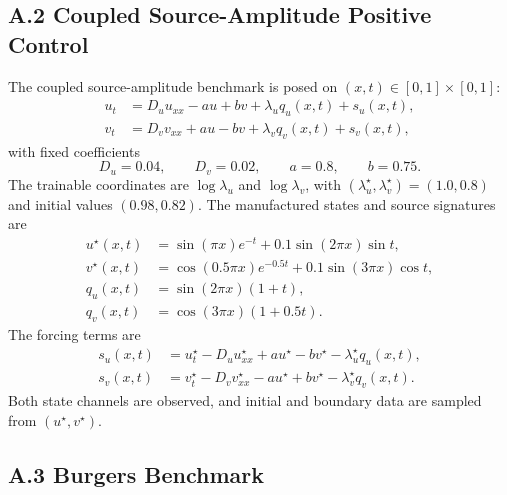 \documentclass[preprint,12pt]{elsarticle}
\begin{document}
\subsection*{A.2 Coupled Source-Amplitude Positive Control}

The coupled source-amplitude benchmark is posed on $(x,t)\in[0,1]\times[0,1]$:
\begin{align}
    u_t &=D_u u_{xx}-a u+bv+\lambda_u q_u(x,t)+s_u(x,t),\\
    v_t &=D_v v_{xx}+a u-bv+\lambda_v q_v(x,t)+s_v(x,t),
\end{align}
with fixed coefficients
\begin{equation}
    D_u=0.04,\qquad D_v=0.02,\qquad a=0.8,\qquad b=0.75.
\end{equation}
The trainable coordinates are $\log\lambda_u$ and $\log\lambda_v$, with $(\lambda_u^\star,\lambda_v^\star)=(1.0,0.8)$ and initial values $(0.98,0.82)$.  The manufactured states and source signatures are
\begin{align}
    u^\star(x,t)&=\sin(\pi x)e^{-t}+0.1\sin(2\pi x)\sin t,\\
    v^\star(x,t)&=\cos(0.5\pi x)e^{-0.5t}+0.1\sin(3\pi x)\cos t,\\
    q_u(x,t)&=\sin(2\pi x)(1+t),\\
    q_v(x,t)&=\cos(3\pi x)(1+0.5t).
\end{align}
The forcing terms are
\begin{align}
    s_u(x,t)&=u_t^\star-D_u u_{xx}^\star+a u^\star-bv^\star-\lambda_u^\star q_u(x,t),\\
    s_v(x,t)&=v_t^\star-D_v v_{xx}^\star-a u^\star+bv^\star-\lambda_v^\star q_v(x,t).
\end{align}
Both state channels are observed, and initial and boundary data are sampled from $(u^\star,v^\star)$.

\subsection*{A.3 Burgers Benchmark}
\end{document}
